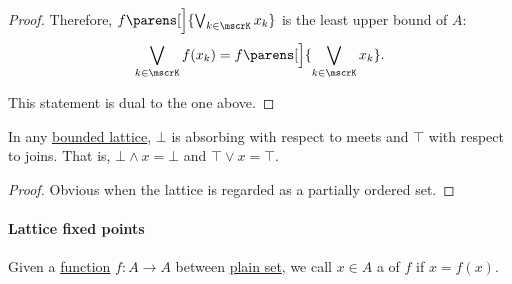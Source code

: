 \begin{proof}
  Therefore, \( f\parens[\Big]{ \bigvee_{k \in \mscrK} x_k } \) is the least upper bound of \( A \):
  \begin{equation*}
    \bigvee_{k \in \mscrK} f(x_k) = f\parens[\Big]{ \bigvee_{k \in \mscrK} x_k }.
  \end{equation*}

   This statement is dual to the one above.
\end{proof}

\begin{proposition}\label{thm:bounded_lattice_absorbing}
  In any \hyperref[def:semilattice/bounded]{bounded lattice}, \( \bot \) is absorbing with respect to meets and \( \top \) with respect to joins. That is, \( \bot \wedge x = \bot \) and \( \top \vee x = \top \).
\end{proposition}
\begin{proof}
  Obvious when the lattice is regarded as a partially ordered set.
\end{proof}

\paragraph{Lattice fixed points}

\begin{definition}\label{def:fixed_point}\mimprovised
  Given a \hyperref[def:function]{function} \( f: A \to A \) between \hyperref[def:set]{plain set}, we call \( x \in A \) a  of \( f \) if \( x = f(x) \).
\end{definition}

